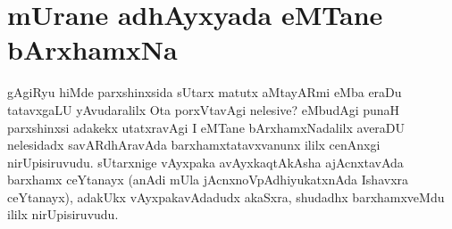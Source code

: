 
\section*{mUrane adhAyxyada eMTane bArxhamxNa}



\begin{artha}%
gAgiRyu hiMde parxshinxsida sUtarx matutx aMtayARmi eMba eraDu tatavxgaLU yAvudaralilx Ota porxVtavAgi nelesive? eMbudAgi punaH parxshinxsi adakekx utatxravAgi I eMTane bArxhamxNadalilx averaDU nelesidadx savARdhAravAda barxhamxtatavxvanunx ililx cenAnxgi nirUpisiruvudu. sUtarxnige vAyxpaka avAyxkaqtAkAsha ajAcnxtavAda barxhamx ceYtanayx (anAdi mUla jAcnxnoVpAdhiyukatxnAda Ishavxra ceYtanayx), adakUkx vAyxpakavAdadudx akaSxra, shudadhx barxhamxveMdu ililx nirUpisiruvudu.
\end{artha}

